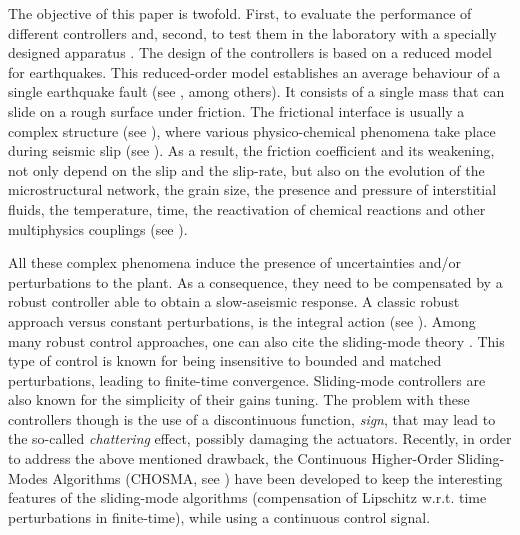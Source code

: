 \documentclass[journal,twoside,web]{ieeecolor}
\begin{document}
The objective of this paper is twofold. First, to evaluate the performance of different controllers and, second, to test them in the laboratory with a specially designed apparatus \cite{b:Stefanou-Tzortzopoulos-Braun-Patent}. The design of the controllers is based on a reduced model for earthquakes. This reduced-order model establishes an average behaviour of a single earthquake fault (see \cite{b:Scholz-2002}, among others). It consists of a single mass that can slide on a rough surface under friction. The frictional interface is usually a complex structure (see \cite{b:Ben-Zion-Sammis-2003,b:Brodie-Fettes-Harte-Schmid-2007}), where various physico-chemical phenomena take place during seismic slip (see \cite{b:Scholz-2002,b:Rattez-Stefanou-Sulem-2018,b:Rattez-Stefanou-Sulem-Veveakis-Poulet-2018,b:Reches-Lockner-2010}). As a result, the friction coefficient and its weakening, not only depend on the slip and the slip-rate, but also on the evolution of the microstructural network, the grain size, the presence and pressure of interstitial fluids, the temperature, time, the reactivation of chemical reactions and other multiphysics couplings (see \cite{b:Brantut-Sulem-2012,b:Veveakis-Alevizos-Vardoulakis-2010,b:Veveakis-Stefanou-Sulem-2013,b:Collins-craft2020}).
 
All these complex phenomena induce the presence of uncertainties and/or perturbations to the plant. As a consequence, they need to be compensated by a robust controller able to obtain a slow-aseismic response. A classic robust approach versus constant perturbations, is the integral action (see \cite[Chapter 12]{b:Khalil2002}). Among many robust control approaches, one can also cite the sliding-mode theory \cite{b:utkin92,b:SMC_Fridman}. This type of control is known for being insensitive to bounded and matched perturbations, leading to finite-time convergence. Sliding-mode controllers are also known for the simplicity of their gains tuning. The problem with these controllers though is the use of a discontinuous function, \textit{sign}, that may lead to the so-called \textit{chattering} effect, possibly damaging the actuators. Recently, in order to address the above mentioned drawback, the Continuous Higher-Order Sliding-Modes Algorithms (CHOSMA, see \cite{b:Chalanga-Kamal-Bandyopadhyay,b:Torres-Sanchez-Fridman-Moreno,b:Moreno_2016}) have been developed to keep the interesting features of the sliding-mode algorithms (compensation of Lipschitz w.r.t. time perturbations in finite-time), while using a continuous control signal.
\end{document}

